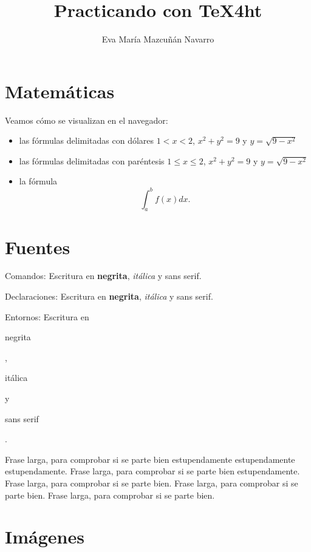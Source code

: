 \documentclass[12pt,a4paper,twoside]{article}
\title{Practicando con \TeX4ht{}}
\author{Eva María Mazcuñán Navarro}
\begin{document}
\maketitle

\ifdefined\HCode
\else
	\tableofcontents
\fi



\section{Matemáticas}

\label{sec:math}

Veamos cómo se visualizan en el navegador:

\begin{itemize}
	\item las fórmulas delimitadas con dólares $1<x<2$, $x^2+y^2=9$ y $y=\sqrt{9-x^2}$
	
	\item las fórmulas delimitadas con paréntesis \(1\le x \le 2\), \(x^2+y^2=9\) y  \(y=\sqrt{9-x^2}\)
	
	\item la fórmula \[\int_a^b f(x)dx.\]
\end{itemize}

\section{Fuentes}

Comandos: Escritura en \textbf{\bfseries negrita}, \textit{\itshape itálica} y \textsf{\sffamily sans serif}.


Declaraciones: Escritura en {\bfseries negrita}, {\itshape itálica} y {\sffamily sans serif}.

Entornos: Escritura en \begin{bfseries}negrita\end{bfseries}, \begin{itshape} itálica \end{itshape} y  \begin{sffamily} sans serif \end{sffamily}.

Frase larga, para comprobar si se parte bien estupendamente  estupendamente  estupendamente. Frase larga, para comprobar si se parte bien estupendamente. Frase larga, para comprobar si se parte bien. Frase larga, para comprobar si se parte bien. Frase larga, para comprobar si se parte bien.

\section{Imágenes}
\end{document}
